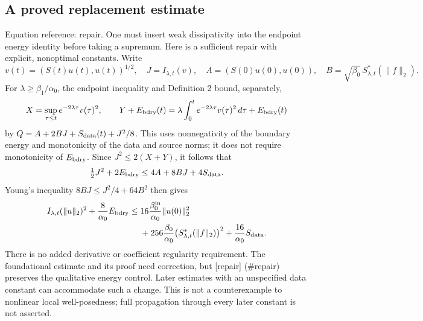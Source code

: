\documentclass[10pt]{article}
\begin{document}
\subsection*{A proved replacement estimate}
Equation reference: repair. One must insert weak dissipativity into the endpoint energy identity before taking a supremum. Here is a sufficient repair with explicit, nonoptimal constants. Write \[v(t)=(S(t)u(t),u(t))^{1/2},\quad J=I_{\lambda,t}(v),\quad
 A=(S(0)u(0),u(0)),\quad
 B=\sqrt{\beta_0}\,S^*_{\lambda,t}(\|f\|_2).\] For \(\lambda\ge\beta_1/\alpha_0\), the endpoint inequality and Definition 2 bound, separately, \[X=\sup_{\tau\le t}e^{-2\lambda\tau}v(\tau)^2,\qquad
 Y+E_{\rm bdry}(t)
       =\lambda\int_0^t e^{-2\lambda\tau}v(\tau)^2\,d\tau
          +E_{\rm bdry}(t)\] by \(Q=A+2BJ+S_{\rm data}(t)+J^2/8\). This uses nonnegativity of the boundary energy and monotonicity of the data and source norms; it does not require monotonicity of \(E_{\rm bdry}\). Since \(J^2\le2(X+Y)\), it follows that \[\tfrac12J^2+2E_{\rm bdry}\le4A+8BJ+4S_{\rm data}.\] Young’s inequality \(8BJ\le J^2/4+64B^2\) then gives \[
\begin{split}
 I_{\lambda,t}(\|u\|_2)^2+\frac8{\alpha_0}E_{\rm bdry}
 \le{}&16\frac{\beta_0^{\rm in}}{\alpha_0}\|u(0)\|_2^2\\
 &+256\frac{\beta_0}{\alpha_0}
             \bigl(S^*_{\lambda,t}(\|f\|_2)\bigr)^2
 +\frac{16}{\alpha_0}S_{\rm data}.
\end{split}\] There is no added derivative or coefficient regularity requirement. The foundational estimate and its proof need correction, but [repair] (\#repair) preserves the qualitative energy control. Later estimates with an unspecified data constant can accommodate such a change. This is not a counterexample to nonlinear local well-posedness; full propagation through every later constant is not asserted.\par
\end{document}
